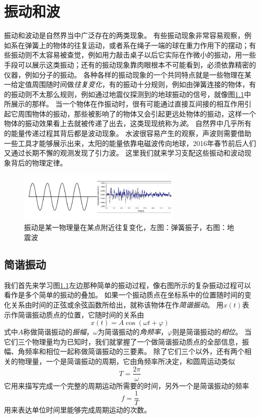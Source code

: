 
\chapter{振动和波}
振动和波动是自然界当中广泛存在的两类现象。
有些振动现象非常容易观察，例如系在弹簧上的物体的往复运动，或者系在绳子一端的球在重力作用下的摆动；有些振动则不太容易被查觉，例如用力敲击桌子以后它实际在作微小的振动，用一些手段可以展示这类振动；还有的振动现象靠肉眼根本不可能看到，必须依靠精密的仪器，例如分子的振动。
各种各样的振动现象的一个共同特点就是一些物理在某一给定值周围随时间做\emph{往复变化}，有的振动十分规则，例如由弹簧连接的物体，有的振动则不太那么规则，例如通过地震仪探测到的地球振动的信号，就像图\ref{fig: ow-简单和复杂的振动}中所展示的那样。
当一个物体在作振动时，很有可能通过直接互间接的相互作用引起它周围物体的振动，那些被影响了的物体又会引起更远处物体的振动，这样一个物体的振动效果看上去就被传递了出去，这类现现统称为\emph{波}。
自然界中几乎所有的能量传递过程其背后都是波动现象。
水波很容易产生的观察，声波则需要借助一些工具才能够展示出来，太阳的能量依靠电磁波传向地球，2016年春节前后人们又通过长期不懈的观测发现了引力波。
这里我们就来学习支配这些振动和波动现象背后的物理定律。
\begin{figure}[hbtp]

\centering
\includegraphics[width=0.7\textwidth]{images/ow-oscillation-examples.pdf}
\caption{振动是某一物理量在某点附近往复变化，左图：弹簧振子，右图：地震波}\label{fig: ow-简单和复杂的振动}
\end{figure}

\section{简谐振动}
我们首先来学习图\ref{fig: ow-简单和复杂的振动}左边那种简单的振动过程，像右图所示的复杂振动过程可以看作是多个简单的振动的叠加。
如果一个振动质点在坐标系中的位置随时间的变化关系由时间的正弦或余弦函数所给出，就称该物体在作\emph{简谐振动}。
用$x(t)$表示作简谐振动质点的位置，它随时间的关系由
\begin{equation}\label{eqn: ow-简谐振动x-t}
x(t) = A\cos(\omega t+\varphi)
\end{equation}
式中$A$称做简谐振动的\emph{振幅}，$\omega$为简谐振动的\emph{角频率}，$\varphi$则是简谐振动的\emph{相位}。
当它们三个物理量均为已知时，我们就掌握了一个做简谐振动质点的全部信息，振幅、角频率和相位一起称做简谐振动的三要素。
除了它们三个以外，还有两个相关的物理量，一个是简谐振动的周期，它由角频率所决定，和圆周运动类似
\begin{equation}
T = \frac{2\pi}{\omega}
\end{equation}
它用来描写完成一个完整的周期运动所需要的时间，另外一个是简谐振动的频率
\begin{equation}
f = \frac{1}{T}
\end{equation}
用来表达单位时间里能够完成周期运动的次数。


